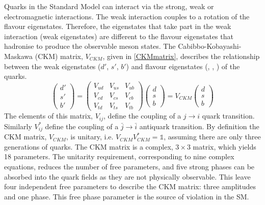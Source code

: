 Quarks in the Standard Model can interact via the strong, weak or electromagnetic interactions. The weak interaction couples to a rotation of the flavour eigenstates.
Therefore, the eigenstates that take part in the weak interaction (weak eigenstates) are different to the flavour eigenstates that hadronise to produce the observable meson states. The Cabibbo-Kobayashi-Maskawa (CKM) matrix, $V_{CKM}$, given in \eqn \ref{CKMmatrix}, describes the relationship between the weak eigenstates ($d'$, $s'$, $b'$) and flavour eigenstates (\dquark, \squark, \bquark) of the quarks. 
\begin{equation}
\left(
\begin{array}{c} d' \\ s' \\ b'  \end{array} \right) =
\begin{pmatrix} V_{ud} & V_{us} & V_{ub} \\ V_{cd} & V_{cs} & V_{cb} \\ V_{td} & V_{ts} & V_{tb} \end{pmatrix} \left( 
\begin{array}{c} d \\ s \\ b \end{array} \right) =
V_{CKM} \left( \begin{array}{c} d \\ s \\ b \end{array} \right)
\label{CKMmatrix}
\end{equation}
The elements of this matrix, $V_{ij}$, define the coupling of a $j \to i$ quark transition. Similarly $V_{ij}^*$ define the coupling of a $\bar{j} \to \bar{i}$ antiquark transition. By definition the CKM matrix, $V_{CKM}$, is unitary, i.e. $V_{CKM}V_{CKM}^* = \mathds{1}$, assuming there are only three generations of quarks. The CKM matrix is a complex, $3 \times 3$ matrix, which yields 18 parameters. The unitarity requirement, corresponding to nine complex equations, reduces the number of free parameters, and five strong phases can be absorbed into the quark fields as they are not physically observable. This leave four independent free parameters to describe the CKM matrix: three amplitudes and one phase. This free phase parameter is the source of \CP violation in the SM. 

